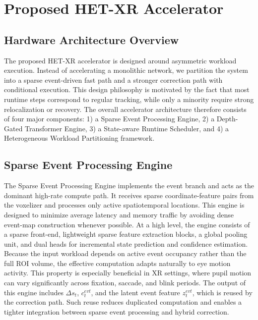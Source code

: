 \documentclass[journal]{IEEEtran}
\begin{document}
\section{Proposed HET-XR Accelerator}
\label{sec:hardware}
\subsection{Hardware Architecture Overview}
The proposed HET-XR accelerator is designed around asymmetric workload execution. Instead of accelerating a monolithic network, we partition the system into a sparse event-driven fast path and a stronger correction path with conditional execution. This design philosophy is motivated by the fact that most runtime steps correspond to regular tracking, while only a minority require strong relocalization or recovery. The overall accelerator architecture therefore consists of four major components: 1) a Sparse Event Processing Engine, 2) a Depth-Gated Transformer Engine, 3) a State-aware Runtime Scheduler, and 4) a Heterogeneous Workload Partitioning framework.
%
\subsection{Sparse Event Processing Engine}
The Sparse Event Processing Engine implements the event branch and acts as the dominant high-rate compute path. It receives sparse coordinate-feature pairs from the voxelizer and processes only active spatiotemporal locations. This engine is designed to minimize average latency and memory traffic by avoiding dense event-map construction whenever possible.
%
At a high level, the engine consists of a sparse front-end, lightweight sparse feature extraction blocks, a global pooling unit, and dual heads for incremental state prediction and confidence estimation. Because the input workload depends on active event occupancy rather than the full ROI volume, the effective computation adapts naturally to eye motion activity. This property is especially beneficial in XR settings, where pupil motion can vary significantly across fixation, saccade, and blink periods.
The output of this engine includes $\Delta s_t$, $c_t^{evt}$, and the latent event feature $z_t^{evt}$, which is reused by the correction path. Such reuse reduces duplicated computation and enables a tighter integration between sparse event processing and hybrid correction.
%
\end{document}
